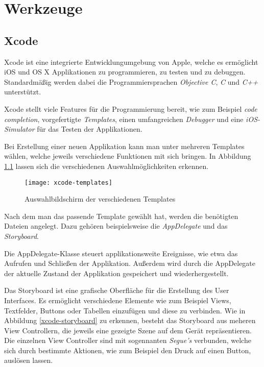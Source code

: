 \chapter{Werkzeuge}
\label{chap:tools}

\section{Xcode}
\label{sec:tools:xcode}
Xcode ist eine integrierte Entwicklungumgebung von Apple, welche es ermöglicht iOS und OS X Applikationen zu programmieren, zu testen und zu debuggen.
Standardmäßig werden dabei die Programmiersprachen \emph{Objective C}, \emph{C} und \emph{C++} unterstützt.

Xcode stellt viele Features für die Programmierung bereit, wie zum Beispiel \emph{code completion}, vorgefertigte \emph{Templates}, einen umfangreichen \emph{Debugger} und eine \emph{iOS-Simulator} für das Testen der Applikationen.

Bei Erstellung einer neuen Applikation kann man unter mehreren Templates wählen, welche jeweils verschiedene Funktionen mit sich bringen. In Abbildung \ref{xcode-templates} lassen sich die verschiedenen Auswahlmöglichkeiten erkennen.

\begin{figure}[htb!]
		\centering
	\texttt{[image: xcode-templates]}
	\caption{Auswahlbildschirm der verschiedenen Templates}
	\label{xcode-templates}
\end{figure}

Nach dem man das passende Template gewählt hat, werden die benötigten Dateien angelegt.
Dazu gehören beispielsweise die \emph{AppDelegate} und das \emph{Storyboard}.

Die AppDelegate-Klasse steuert applikationsweite Ereignisse, wie etwa das Aufrufen und Schließen der Applikation. Außerdem wird durch die AppDelegate der aktuelle Zustand der Applikation gespeichert und wiederhergestellt.

Das Storyboard ist eine grafische Oberfläche für die Erstellung des User Interfaces. Es ermöglicht verschiedene Elemente wie zum Beispiel Views, Textfelder, Buttons oder Tabellen einzufügen und diese zu verbinden. Wie in Abbildung \ref{xcode-storyboard} zu erkennen, besteht das Storyboard aus meheren View Controllern, die jeweils eine gezeigte Szene auf dem Gerät repräsentieren. Die einzelnen View Controller sind mit sogennanten \emph{Segue's} verbunden, welche sich durch bestimmte Aktionen, wie zum Beispiel den Druck auf einen Button, auslösen lassen.


